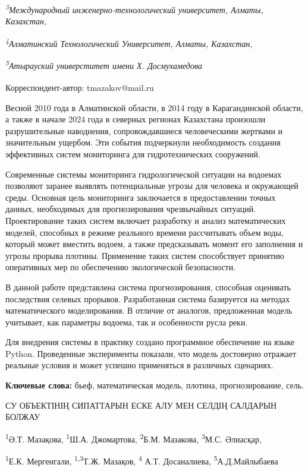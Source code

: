 {\emph{\textsuperscript{3}Международный инженерно-технологический
университет, Алматы, Казахстан,}

\emph{\textsuperscript{4}Алматинский Технологический Университет,
Алматы, Казахстан,}

\emph{\textsuperscript{5}Атырауский универститет имени Х. Досмухамедова}

{\bfseries \textsuperscript{\envelope }}Корреспондент-автор: tmazakov@mail.ru

Весной 2010 года в Алматинской области, в 2014 году в Карагандинской
области, а также в начале 2024 года в северных регионах Казахстана
произошли разрушительные наводнения, сопровождавшиеся человеческими
жертвами и значительным ущербом. Эти события подчеркнули необходимость
создания эффективных систем мониторинга для гидротехнических сооружений.

Современные системы мониторинга гидрологической ситуации на водоемах
позволяют заранее выявлять потенциальные угрозы для человека и
окружающей среды. Основная цель мониторинга заключается в предоставлении
точных данных, необходимых для прогнозирования чрезвычайных ситуаций.
Проектирование таких систем включает разработку и анализ математических
моделей, способных в режиме реального времени рассчитывать объем воды,
который может вместить водоем, а также предсказывать момент его
заполнения и угрозы прорыва плотины. Применение таких систем
способствует принятию оперативных мер по обеспечению экологической
безопасности.

В данной работе представлена система прогнозирования, способная
оценивать последствия селевых прорывов. Разработанная система базируется
на методах математического моделирования. В отличие от аналогов,
предложенная модель учитывает, как параметры водоема, так и особенности
русла реки.

Для внедрения системы в практику создано программное обеспечение на
языке Python. Проведенные эксперименты показали, что модель достоверно
отражает реальные условия и может успешно применяться в различных
сценариях.

{\bfseries Ключевые слова:} бьеф, математическая модель, плотина,
прогнозирование, сель.

СУ ОБЪЕКТІНІҢ СИПАТТАРЫН ЕСКЕ АЛУ МЕН СЕЛДІҢ САЛДАРЫН БОЛЖАУ

\textsuperscript{1}Ә.Т. Мазақова, \textsuperscript{1}Ш.А. Джомартова,
\textsuperscript{2}Б.М. Мазакова, \textsuperscript{3}М.С. Әлиасқар,

\textsuperscript{1}Е.К. Мергенгали, \textsuperscript{1,3}Т.Ж. Мазақов,
\textsuperscript{4} А.Т. Досаналиева, \textsuperscript{5}А.Д.Майлыбаева

}
